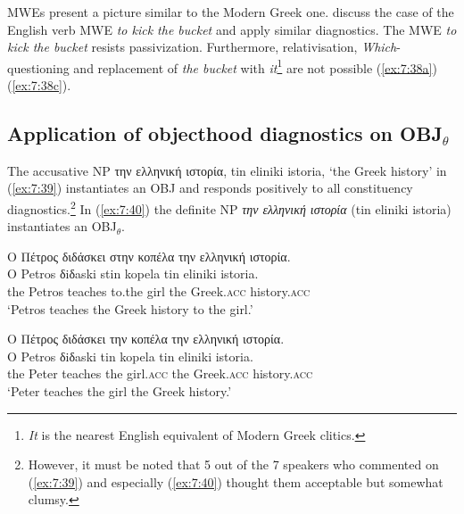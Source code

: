 \documentclass[output=paper]{langsci/langscibook}
\begin{document}
 MWEs present a picture similar to the Modern Greek one. \citet{kaysagidioms} discuss the case of the English verb MWE \textit{to kick the bucket} and apply similar diagnostics. The MWE \textit{to kick the bucket} resists passivization. Furthermore,  relativisation, \textit{Which}-questioning and replacement of \textit{the bucket} with \textit{it}\footnote{\textit{It} is the nearest English equivalent of Modern Greek clitics.} are not possible  (\ref{ex:7:38a})\textendash(\ref{ex:7:38c}).

\begin{exe}
\label{ex:7:38}
\ex \begin{xlist}
\end{xlist}
\end{exe}


\subsection{Application of objecthood diagnostics on OBJ$_\theta$}


The accusative NP  την ελληνική ιστορία, tin eliniki istoria, `the Greek history' in (\ref{ex:7:39}) instantiates an OBJ and responds positively to all constituency diagnostics.\footnote{However,  it must be noted that 5 out of the 7 speakers who commented on (\ref{ex:7:39}) and especially (\ref{ex:7:40}) thought them acceptable but somewhat clumsy.} In (\ref{ex:7:40}) the definite NP \textit{την ελληνική ιστορία} (tin eliniki istoria) instantiates an OBJ$_\theta$. 

\ea%
    \label{ex:7:39}
\glll Ο Πέτρος διδάσκει στην κοπέλα την ελληνική ιστορία. \\
O Petros δiδaski stin kopela tin eliniki istoria. \\
     the Petros  teaches to.the girl the Greek.\textsc{acc} history.\textsc{acc}\\
\glt `Petros teaches the Greek history  to the girl.'
\z

\ea%
    \label{ex:7:40}
\glll Ο Πέτρος διδάσκει την κοπέλα την ελληνική ιστορία.\\
O Petros δiδaski tin kopela tin eliniki istoria.\\
     the Peter  teaches the girl.\textsc{acc} the Greek.\textsc{acc} history.\textsc{acc}\\
\glt `Peter teaches the girl the Greek history.'
\z
\end{document}

